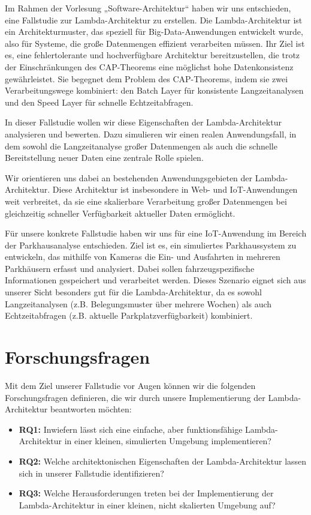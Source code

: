 Im Rahmen der Vorlesung „Software-Architektur“ haben wir uns entschieden, eine Fallstudie zur Lambda-Architektur zu erstellen. Die Lambda-Architektur ist ein Architekturmuster, das speziell für Big-Data-Anwendungen entwickelt wurde, also für Systeme, die große Datenmengen effizient verarbeiten müssen. Ihr Ziel ist es, eine fehlertolerante und hochverfügbare Architektur bereitzustellen, die trotz der Einschränkungen des CAP-Theorems eine möglichst hohe Datenkonsistenz gewährleistet. Sie begegnet dem Problem des CAP-Theorems, indem sie zwei Verarbeitungswege kombiniert: den Batch Layer für konsistente Langzeitanalysen und den Speed Layer für schnelle Echtzeitabfragen.

In dieser Fallstudie wollen wir diese Eigenschaften der Lambda-Architektur analysieren und bewerten. Dazu simulieren wir einen realen Anwendungsfall, in dem sowohl die Langzeitanalyse großer Datenmengen als auch die schnelle Bereitstellung neuer Daten eine zentrale Rolle spielen.

Wir orientieren uns dabei an bestehenden Anwendungsgebieten der Lambda-Architektur. Diese Architektur ist insbesondere in Web- und IoT-Anwendungen weit verbreitet, da sie eine skalierbare Verarbeitung großer Datenmengen bei gleichzeitig schneller Verfügbarkeit aktueller Daten ermöglicht.

Für unsere konkrete Fallstudie haben wir uns für eine IoT-Anwendung im Bereich der Parkhausanalyse entschieden. Ziel ist es, ein simuliertes Parkhaussystem zu entwickeln, das mithilfe von Kameras die Ein- und Ausfahrten in mehreren Parkhäusern erfasst und analysiert. Dabei sollen fahrzeugspezifische Informationen gespeichert und verarbeitet werden. Dieses Szenario eignet sich aus unserer Sicht besonders gut für die Lambda-Architektur, da es sowohl Langzeitanalysen (z.B. Belegungsmuster über mehrere Wochen) als auch Echtzeitabfragen (z.B. aktuelle Parkplatzverfügbarkeit) kombiniert.


\section{Forschungsfragen}
Mit dem Ziel unserer Fallstudie vor Augen können wir die folgenden Forschungsfragen definieren, die wir durch unsere Implementierung der Lambda-Architektur beantworten möchten:
\begin{itemize}
	\item \textbf{RQ1:} Inwiefern lässt sich eine einfache, aber funktionsfähige Lambda-Architektur in einer kleinen, simulierten Umgebung implementieren?
	\item \textbf{RQ2:} Welche architektonischen Eigenschaften der Lambda-Architektur lassen sich in unserer Fallstudie identifizieren?
	\item \textbf{RQ3:} Welche Herausforderungen treten bei der Implementierung der Lambda-Architektur in einer kleinen, nicht skalierten Umgebung auf?
\end{itemize}

